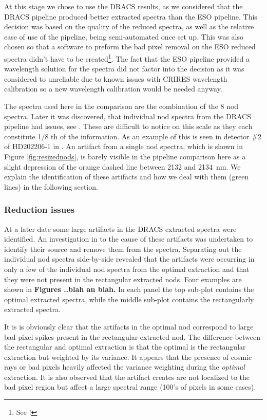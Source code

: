 At this stage we chose to use the DRACS results, as we considered that the DRACS pipeline produced better extracted spectra than the ESO pipeline. This decision was based on the quality of the reduced spectra, as well as the relative ease of use of the pipeline, being semi-automated once set up. This was also chosen so that a software to preform the bad pixel removal on the ESO reduced spectra didn't have to be created\footnote{See !}. The fact that the ESO pipeline provided a wavelength solution for the spectra did not factor into the decision as it was considered to unreliable due to known issues with CRIRES wavelength calibration so a new wavelength calibration would be needed anyway.

The spectra used here in the comparison are the combination of the 8 nod spectra. Later it was discovered, that individual nod spectra from the DRACS pipeline had issues, see . These are difficult to notice on this scale as they each constitute 1/8 th of the information. As an example of this is seen in detector \#2 of HD202206-1 in . An artifact from a single nod spectra, which is shown in Figure \ref{fig:resizednods}, is barely visible in the pipeline comparison here as a slight depression of the orange dashed line between 2132 and 2134~nm. We explain the identification of these artifacts and how we deal with them (green lines) in the following section.

\subsubsection{Reduction issues}
\label{subsubsec:reductionartifacts}
At a later date some large artifacts in the DRACS extracted spectra were identified. An investigation in to the cause of these artifacts was undertaken to identify their source and remove them from the spectra. Separating out the individual nod spectra side-by-side revealed that the artifacts were occurring in only a few of the individual nod spectra from the optimal extraction and that they were not present in the rectangular extracted nods. Four examples are shown in \textbf{Figures ..blah an blah.} In each panel the top sub-plot contains the optimal extracted spectra, while the middle sub-plot contains the rectangularly extracted spectra.

It is is obviously clear that the artifacts in the optimal nod correspond to large bad pixel spikes present in the rectangular extracted nod. The difference between the rectangular and optimal extraction is that the optimal is the rectangular extraction but weighted by its variance. It appears that the presence of cosmic rays or bad pixels heavily affected the variance weighting during the \emph{optimal} extraction. It is also observed that the artifact creates are not localized to the bad pixel region but affect a large spectral range (100's of pixels in some cases). 

